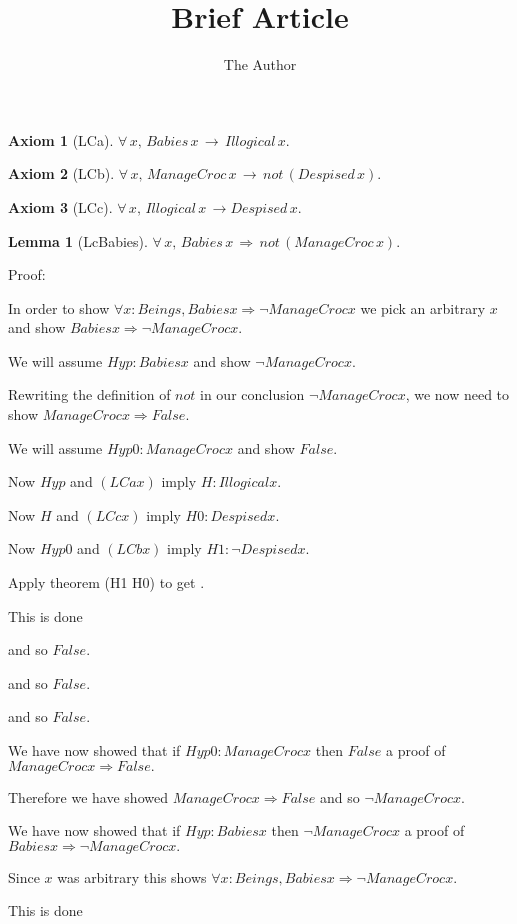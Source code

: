 \documentclass[11pt, oneside]{article}
\title{Brief Article}
\author{The Author}
\date{}							%
\newtheorem{Lemma}{Lemma}
\newtheorem{Axiom}{Axiom}
\begin{document}
\maketitle

\begin{Axiom}[LCa] 
$∀\,x,\,Babies\,x\,→\,Illogical\,x.$
 \end{Axiom}
\begin{Axiom}[LCb] 
$∀\,x,\,ManageCroc\,x\,→\,not\,(Despised\,x).$
 \end{Axiom}
\begin{Axiom}[LCc] 
$∀\,x,\,Illogical\,x\,→Despised\,x.$
 \end{Axiom}
\begin{Lemma}[LcBabies] 
$\forall \,x,\,Babies\,x\,\Rightarrow \,not\,(ManageCroc\,x).$
 \end{Lemma}


 Proof: \begin{subproof}In order to show $\forall x : Beings, Babies x \Rightarrow ¬ ManageCroc x $ we pick an arbitrary $x$ and show $Babies x \Rightarrow ¬ ManageCroc x .$

 

 \begin{subproof}We will assume $Hyp : Babies x $ and show $¬ ManageCroc x .$

 \begin{subproof}Rewriting the definition of $not$ in our conclusion $¬ ManageCroc x $, we now need to show $ManageCroc x \Rightarrow False .$

 \begin{subproof}We will assume $Hyp0 : ManageCroc x $ and show $False .$

 \begin{subproof}Now $Hyp$ and $(LCa x)$ imply $H : Illogical x .$

 \begin{subproof}Now $H$ and $(LCc x)$ imply $H0 : Despised x .$

 \begin{subproof}Now $Hyp0$ and $(LCb x)$ imply $H1 : ¬ Despised x .$

 \begin{subproof}Apply theorem (H1 H0) to get $ .$

 \begin{subproof}This is done\end{subproof}\end{subproof} and so $False .$\end{subproof} and so $False .$\end{subproof} and so $False .$\end{subproof} We have now showed that if $Hyp0 : ManageCroc x $ then $False $ a proof of $ManageCroc x \Rightarrow False .$\end{subproof} Therefore we have showed $ManageCroc x \Rightarrow False $ and so $¬ ManageCroc x .$\end{subproof} We have now showed that if $Hyp : Babies x $ then $¬ ManageCroc x $ a proof of $Babies x \Rightarrow ¬ ManageCroc x .$\end{subproof} Since $x$ was arbitrary this shows $\forall x : Beings, Babies x \Rightarrow ¬ ManageCroc x .$\end{subproof}This is done
\end{document}
